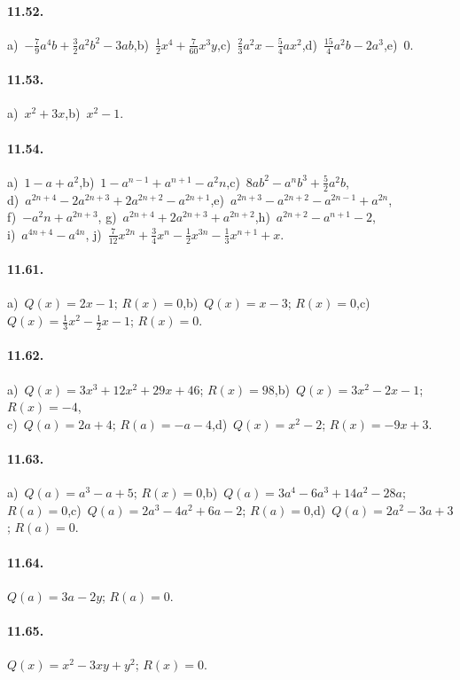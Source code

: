 \paragraph{11.52.} a)~$-\frac{7}{9}a^{4}b+\frac{3}{2}a^2b^2-3ab$,\quad b)~$\frac{1}{2}x^{4}+\frac{7}{60}x^{3}y$,\quad c)~$\frac{2}{3}a^{2}x-\frac{5}{4}ax^{2}$,\quad d)~$\frac{15}{4}a^{2}b-2a^{3}$,\quad e)~$0$.
\paragraph{11.53.} a)~$x^{2}+3x$,\quad b)~$x^{2}-1$.
\paragraph{11.54.} a)~$1-a+a^{2}$,\quad b)~$1-a^{n-1}+a^{n+1}-a^{2}n$,\quad c)~$8ab^2-a^nb^3+\frac{5}{2}a^2b$, \protect\\
d)~$a^{2n+4}-2a^{2n+3}+2a^{2n+2}-a^{2n+1}$,\quad e)~$a^{2n+3}-a^{2n+2}-a^{2n-1}+a^{2n}$,\protect\\ f)~$-a^{2}n+a^{2n+3}$,\quad
g)~$a^{2n+4}+2a^{2n+3}+a^{2n+2}$,\quad h)~$a^{2n+2}-a^{n+1}-2$,\protect\\ i)~$a^{4n+4}-a^{4n}$,\quad
j)~$\frac{7}{12}x^{2n}+\frac{3}{4}x^{n}-\frac{1}{2}x^{3n}-\frac{1}{3}x^{n+1}+x$.
\paragraph{11.61.}
a)~$Q(x)=2x-1$; $R(x)=0$,\quad b)~$Q(x)=x-3$; $R(x)=0$,\quad c)~$Q(x)=\frac{1}{3}x^{2}-\frac{1}{2}x-1$; $R(x)=0$.
\paragraph{11.62.}
a)~$Q(x)=3x^{3}+12x^{2}+29x+46$; $R(x)=98$,\quad b)~$Q(x)=3x^{2}-2x-1$; $R(x)=-4$,\protect\\ c)~$Q(a)=2a+4$; $R(a)=-a-4$,\quad d)~$Q(x)=x^{2}-2$; $R(x)=-9x+3$.
\paragraph{11.63.}
a)~$Q(a)=a^{3}-a+5$; $R(x)=0$,\quad b)~$Q(a)=3a^{4}-6a^{3}+14a^{2}-28a$; $R(a)=0$,\quad c)~$Q(a)=2a^{3}-4a^{2}+6a-2$; $R(a)=0$,\quad d)~$Q(a)=2a^{2}-3a+3$; $R(a)=0$.
\paragraph{11.64.}
$Q(a)=3a-2y$; $R(a)=0$.
\paragraph{11.65.}
$Q(x)=x^{2}-3xy+y^{2}$; $R(x)=0$.
